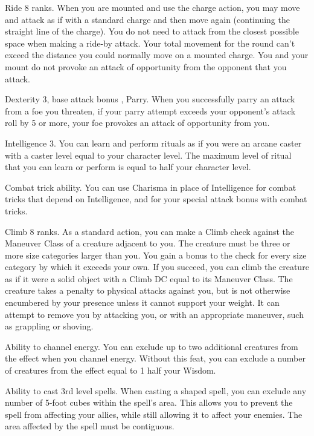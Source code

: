 \featpre Ride 8 ranks.
 When you are mounted and use the charge action, you may move and attack as if with a standard charge and then move again (continuing the straight line of the charge). You do not need to attack from the closest possible space when making a ride-by attack. Your total movement for the round can't exceed the distance you could normally move on a mounted charge. You and your mount do not provoke an attack of opportunity from the opponent that you attack.

\featpre Dexterity 3, base attack bonus , Parry.
\featben When you successfully parry an attack from a foe you threaten, if your parry attempt exceeds your opponent's attack roll by 5 or more, your foe provokes an attack of opportunity from you.

\featpre Intelligence 3.
\featben You can learn and perform rituals as if you were an arcane caster with a caster level equal to your character level. The maximum level of ritual that you can learn or perform is equal to half your character level.

\featpre Combat trick ability.
\featben You can use Charisma in place of Intelligence for combat tricks that depend on Intelligence, and for your special attack bonus with combat tricks.

\featpre Climb 8 ranks.
\featben As a standard action, you can make a Climb check against the Maneuver Class of a creature adjacent to you. The creature must be three or more size categories larger than you. You gain a  bonus to the check for every size category by which it exceeds your own. If you succeed, you can climb the creature as if it were a solid object with a Climb DC equal to its Maneuver Class. The creature takes a  penalty to physical attacks against you, but is not otherwise encumbered by your presence unless it cannot support your weight. It can attempt to remove you by attacking you, or with an appropriate maneuver, such as grappling or shoving.

 Ability to channel energy.
 You can exclude up to two additional creatures from the effect when you channel energy.
 Without this feat, you can exclude a number of creatures from the effect equal to 1 \add half your Wisdom.

 Ability to cast 3rd level spells.
 When casting a shaped spell, you can exclude any number of 5-foot cubes within the spell's area. This allows you to prevent the spell from affecting your allies, while still allowing it to affect your enemies. The area affected by the spell must be contiguous.

